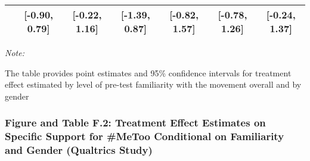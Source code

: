 \documentclass[
]{article}
\begin{document}
\begin{table}[H]
\begin{threeparttable}
\begin{tabular}[t]{lcccccc}
\hspace{1em} & {}[-0.90, 0.79] & {}[-0.22, 1.16] & {}[-1.39, 0.87] & {}[-0.82, 1.57] & {}[-0.78, 1.26] & {}[-0.24, 1.37]\\
\bottomrule
\end{tabular}
\begin{tablenotes}
\small
\item \textit{Note: } 
\item The table provides point estimates and 95\% confidence intervals for treatment effect estimated by level of pre-test familiarity with the movement overall and by gender
\end{tablenotes}
\end{threeparttable}
\end{table}

\hypertarget{figure-and-table-f.2-treatment-effect-estimates-on-specific-support-for-metoo-conditional-on-familiarity-and-gender-qualtrics-study}{%
\subsubsection{Figure and Table F.2: Treatment Effect Estimates on
Specific Support for \#MeToo Conditional on Familiarity and Gender
(Qualtrics
Study)}\label{figure-and-table-f.2-treatment-effect-estimates-on-specific-support-for-metoo-conditional-on-familiarity-and-gender-qualtrics-study}}
\end{document}
